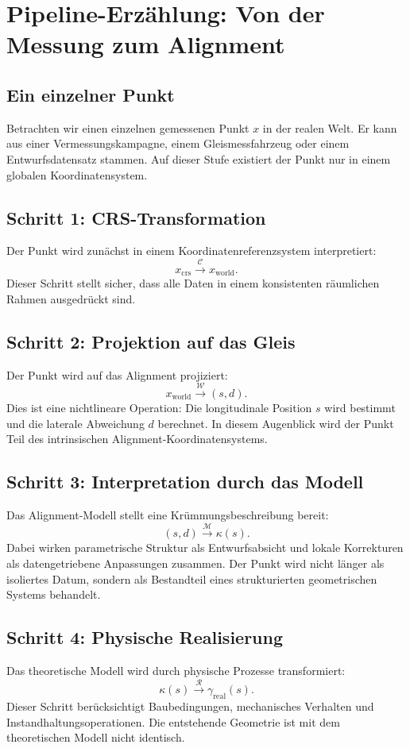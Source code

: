 \section{Pipeline-Erzählung: Von der Messung zum Alignment}

\subsection{Ein einzelner Punkt}
Betrachten wir einen einzelnen gemessenen Punkt \(x\) in der realen Welt. Er
kann aus einer Vermessungskampagne, einem Gleismessfahrzeug oder einem
Entwurfsdatensatz stammen. Auf dieser Stufe existiert der Punkt nur in einem
globalen Koordinatensystem.

\subsection{Schritt 1: CRS-Transformation}
Der Punkt wird zunächst in einem Koordinatenreferenzsystem interpretiert:
\[
x_{\mathrm{crs}}\xrightarrow{\mathcal C}x_{\mathrm{world}}.
\]
Dieser Schritt stellt sicher, dass alle Daten in einem konsistenten räumlichen
Rahmen ausgedrückt sind.

\subsection{Schritt 2: Projektion auf das Gleis}
Der Punkt wird auf das Alignment projiziert:
\[
x_{\mathrm{world}}\xrightarrow{\mathcal W}(s,d).
\]
Dies ist eine nichtlineare Operation: Die longitudinale Position \(s\) wird
bestimmt und die laterale Abweichung \(d\) berechnet. In diesem Augenblick wird
der Punkt Teil des intrinsischen Alignment-Koordinatensystems.

\subsection{Schritt 3: Interpretation durch das Modell}
Das Alignment-Modell stellt eine Krümmungsbeschreibung bereit:
\[
(s,d)\xrightarrow{\mathcal M}\kappa(s).
\]
Dabei wirken parametrische Struktur als Entwurfsabsicht und lokale Korrekturen
als datengetriebene Anpassungen zusammen. Der Punkt wird nicht länger als
isoliertes Datum, sondern als Bestandteil eines strukturierten geometrischen
Systems behandelt.

\subsection{Schritt 4: Physische Realisierung}
Das theoretische Modell wird durch physische Prozesse transformiert:
\[
\kappa(s)\xrightarrow{\mathcal R}\gamma_{\mathrm{real}}(s).
\]
Dieser Schritt berücksichtigt Baubedingungen, mechanisches Verhalten und
Instandhaltungsoperationen. Die entstehende Geometrie ist mit dem theoretischen
Modell nicht identisch.

